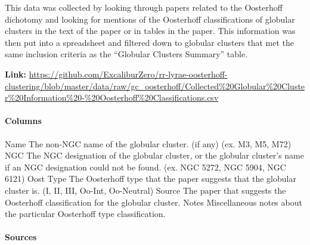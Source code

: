 \documentclass[]{article}
\begin{document}
This data was collected by looking through papers related to the Oosterhoff dichotomy and looking for mentions of the Oosterhoff classifications of globular clusters in the text of the paper or in tables in the paper. This information was then put into a spreadsheet and filtered down to globular clusters that met the same inclusion criteria as the ``Globular Clusters Summary'' table.

\vspace{12pt}

\textbf{Link:} \url{https://github.com/ExcaliburZero/rr-lyrae-oosterhoff-clustering/blob/master/data/raw/gc_oosterhoff/Collected\%20Globular\%20Cluster\%20Information\%20-\%20Oosterhoff\%20Classifications.csv}

\paragraph{Columns}

\begin{outline}
	\1 Name
	\2 The non-NGC name of the globular cluster. (if any) (ex. M3, M5, M72)
	\1 NGC
	\2 The NGC designation of the globular cluster, or the globular cluster’s name if an NGC designation could not be found. (ex. NGC 5272, NGC 5904, NGC 6121)
	\1 Oost Type
	\2 The Oosterhoff type that the paper suggests that the globular cluster is. (I, II, III, Oo-Int, Oo-Neutral)
	\1 Source
	\2 The paper that suggests the Oosterhoff classification for the globular cluster.
	\1 Notes
	\2 Miscellaneous notes about the particular Oosterhoff type classification.
\end{outline}

\paragraph{Sources}
\end{document}
